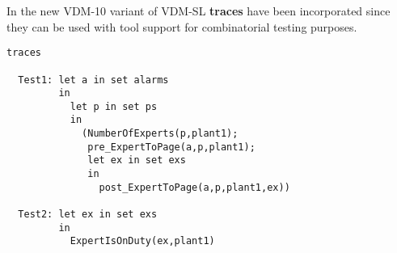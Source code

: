 In the new VDM-10 variant of VDM-SL {\bf\ttfamily traces} have been
incorporated since they can be used with tool support for
combinatorial testing purposes.

\begin{lstlisting}
traces

  Test1: let a in set alarms
         in
           let p in set ps 
           in
             (NumberOfExperts(p,plant1);
              pre_ExpertToPage(a,p,plant1);
              let ex in set exs
              in
                post_ExpertToPage(a,p,plant1,ex))
               
  Test2: let ex in set exs
         in
           ExpertIsOnDuty(ex,plant1)
\end{lstlisting}  
